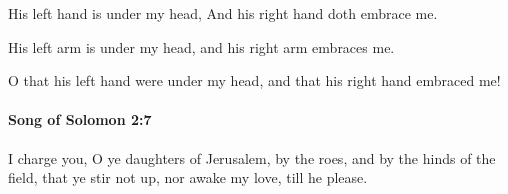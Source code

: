 			\begin{versebox}
					\item[BHS] 
					\item[LXX] 
					\item[ASV] His left hand is under my head, And his right hand doth embrace me.
					\item[NIV] His left arm is under my head, and his right arm embraces me.
					\item[NRSV] O that his left hand were under my head, and that his right hand embraced me!
			\end{versebox}

		\paragraph{Song of Solomon 2:7} %
			\label{SONGOFSOLOMON-2-7}

			I charge you, O ye daughters of Jerusalem, by the roes, and by the hinds of the field, that ye stir not up, nor awake my love, till he please.


